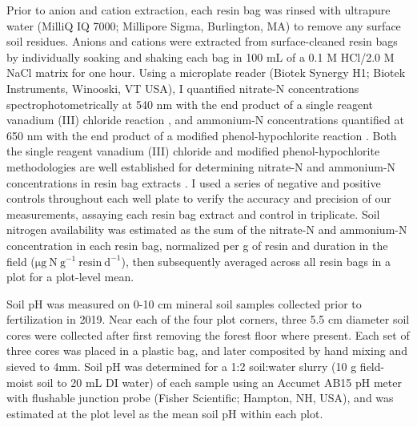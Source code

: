 Prior to anion and cation extraction, each resin bag was rinsed with ultrapure water (MilliQ IQ 7000; Millipore Sigma, Burlington, MA) to remove any surface soil residues. Anions and cations were extracted from surface-cleaned resin bags by individually soaking and shaking each bag in 100 mL of a 0.1 M HCl/2.0 M NaCl matrix for one hour. Using a microplate reader (Biotek Synergy H1; Biotek Instruments, Winooski, VT USA), I quantified nitrate-N concentrations spectrophotometrically at 540 nm with the end product of a single reagent vanadium (III) chloride reaction , and ammonium-N concentrations quantified at 650 nm with the end product of a modified phenol-hypochlorite reaction . Both the single reagent vanadium (III) chloride and modified phenol-hypochlorite methodologies are well established for determining nitrate-N and ammonium-N concentrations in resin bag extracts . I used a series of negative and positive controls throughout each well plate to verify the accuracy and precision of our measurements, assaying each resin bag extract and control in triplicate. Soil nitrogen availability was estimated as the sum of the nitrate-N and ammonium-N concentration in each resin bag, normalized per g of resin and duration in the field ($\mathrm{\mu g\ N\ g^{-1}\ resin\ d^{-1}}$), then subsequently averaged across all resin bags in a plot for a plot-level mean.
    
Soil pH was measured on 0-10 cm mineral soil samples collected prior to fertilization in 2019. Near each of the four plot corners, three 5.5 cm diameter soil cores were collected after first removing the forest floor where present. Each set of three cores was placed in a plastic bag, and later composited by hand mixing and sieved to 4mm. Soil pH was determined for a 1:2 soil:water slurry (10 g field-moist soil to 20 mL DI water) of each sample using an Accumet AB15 pH meter with flushable junction probe (Fisher Scientific; Hampton, NH, USA), and was estimated at the plot level as the mean soil pH within each plot.

